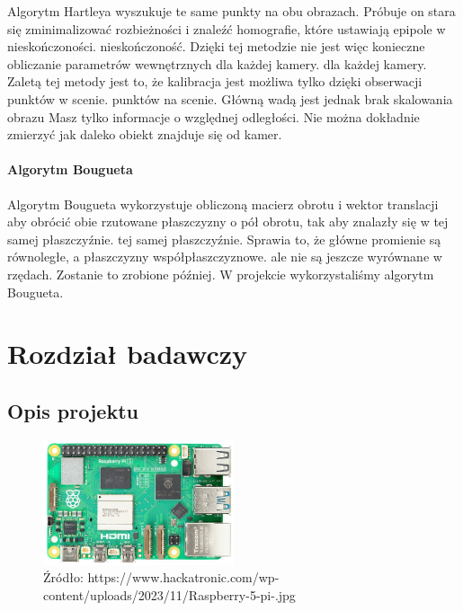 \documentclass[magisterska]{pracadypl}
\begin{document}
Algorytm Hartleya wyszukuje te same punkty na obu obrazach. Próbuje on
stara się zminimalizować rozbieżności i znaleźć homografie, które ustawiają epipole w nieskończoności.
nieskończoność. Dzięki tej metodzie nie jest więc konieczne obliczanie parametrów wewnętrznych dla każdej kamery.
dla każdej kamery.
Zaletą tej metody jest to, że kalibracja jest możliwa tylko dzięki obserwacji punktów w scenie.
punktów na scenie. Główną wadą jest jednak brak skalowania obrazu
Masz tylko informacje o względnej odległości. Nie można dokładnie zmierzyć
jak daleko obiekt znajduje się od kamer.

\subsubsection{Algorytm Bougueta}

Algorytm Bougueta wykorzystuje obliczoną macierz obrotu i wektor translacji
aby obrócić obie rzutowane płaszczyzny o pół obrotu, tak aby znalazły się w tej samej płaszczyźnie.
tej samej płaszczyźnie. Sprawia to, że główne promienie są równoległe, a płaszczyzny współpłaszczyznowe.
ale nie są jeszcze wyrównane w rzędach. Zostanie to zrobione później.
W projekcie wykorzystaliśmy algorytm Bougueta.

\chapter{Rozdział badawczy}

\section{Opis projektu}

\begin{figure}[h]  %
    \centering  %
    \includegraphics[width=0.5\textwidth]{images/RPI.jpg}  %
    \captionsetup{labelformat=empty, font=footnotesize}
    \caption{Źródło: https://www.hackatronic.com/wp-content/uploads/2023/11/Raspberry-5-pi-.jpg}
    \label{fig:rpi}  %
\end{figure}
\end{document}
